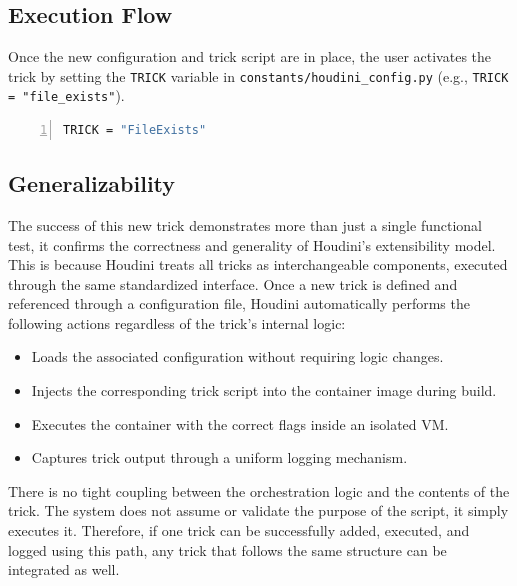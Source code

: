 \documentclass[12pt]{report}
\begin{document}
\begin{doublespace}
\subsection*{Execution Flow}

Once the new configuration and trick script are in place, the user activates the trick by setting the \texttt{TRICK} variable in \texttt{constants/houdini\_config.py} (e.g., \texttt{TRICK = "file\_exists"}). 

\begin{lstlisting}[language=bash, caption={Trick Configuration Parameters}, label={lst:escape-trick}, numbers=left, numberstyle=\tiny, stepnumber=1, frame=single, breaklines=true, backgroundcolor=\color{gray!10}, basicstyle=\ttfamily\footnotesize, showspaces=false, showstringspaces=false]
TRICK = "FileExists"
\end{lstlisting}

\subsection*{Generalizability}

The success of this new trick demonstrates more than just a single functional test, it confirms the correctness and generality of Houdini’s extensibility model. This is because Houdini treats all tricks as interchangeable components, executed through the same standardized interface. Once a new trick is defined and referenced through a configuration file, Houdini automatically performs the following actions regardless of the trick’s internal logic:

\begin{itemize}
\item Loads the associated configuration without requiring logic changes.
\item Injects the corresponding trick script into the container image during build.
\item Executes the container with the correct flags inside an isolated VM.
\item Captures trick output through a uniform logging mechanism.
\end{itemize}

There is no tight coupling between the orchestration logic and the contents of the trick. The system does not assume or validate the purpose of the script, it simply executes it. Therefore, if one trick can be successfully added, executed, and logged using this path, any trick that follows the same structure can be integrated as well.


\end{doublespace}
\end{document}
